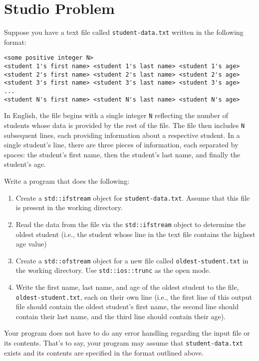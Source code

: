 \documentclass{article}
\begin{document}
\section{Studio Problem}

Suppose you have a text file called \texttt{student-data.txt} written in the following format:

\begin{verbatim}
<some positive integer N>
<student 1's first name> <student 1's last name> <student 1's age>
<student 2's first name> <student 2's last name> <student 2's age>
<student 3's first name> <student 3's last name> <student 3's age>
...
<student N's first name> <student N's last name> <student N's age>
\end{verbatim}

In English, the file begins with a single integer \texttt{N} reflecting the number of students whose data is provided by the rest of the file. The file then includes \texttt{N} subsequent lines, each providing information about a respective student. In a single student's line, there are three pieces of information, each separated by spaces: the student's first name, then the student's last name, and finally the student's age.

Write a program that does the following:

\begin{enumerate}
    \item Create a \texttt{std::ifstream} object for \texttt{student-data.txt}. Assume that this file is present in the working directory.
    \item Read the data from the file via the \texttt{std::ifstream} object to determine the oldest student (i.e., the student whose line in the text file contains the highest age value)
    \item Create a \texttt{std::ofstream} object for a new file called \texttt{oldest-student.txt} in the working directory. Use \texttt{std::ios::trunc} as the open mode.
    \item Write the first name, last name, and age of the oldest student to the file, \texttt{oldest-student.txt}, each on their own line (i.e., the first line of this output file should contain the oldest student's first name, the second line should contain their last name, and the third line should contain their age).
\end{enumerate}

Your program does not have to do any error handling regarding the input file or its contents. That's to say, your program may assume that \texttt{student-data.txt} exists and its contents are specified in the format outlined above.
\end{document}
